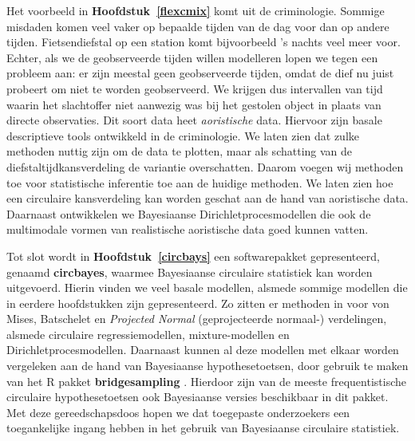 \documentclass[12pt, a4paper]{book}\usepackage[]{graphicx}\usepackage[]{color}
\let\proglang=\textsf
\newcommand{\pkg}[1]{\textbf{#1}}
\begin{document}
Het voorbeeld in \textbf{Hoofdstuk~\ref{flexcmix}} komt uit de criminologie. Sommige misdaden komen veel vaker op bepaalde tijden van de dag voor dan op andere tijden. Fietsendiefstal op een station komt bijvoorbeeld 's nachts veel meer voor. Echter, als we de geobserveerde tijden willen modelleren lopen we tegen een probleem aan: er zijn meestal geen geobserveerde tijden, omdat de dief nu juist probeert om niet te worden geobserveerd. We krijgen dus intervallen van tijd waarin het slachtoffer niet aanwezig was bij het gestolen object in plaats van directe observaties. Dit soort data heet \textit{aoristische} data. Hiervoor zijn basale descriptieve tools ontwikkeld \citep{ashby2013comparison} in de criminologie. We laten zien dat zulke methoden nuttig zijn om de data te plotten, maar als schatting van de diefstaltijdkansverdeling de variantie overschatten. Daarom voegen wij methoden toe voor statistische inferentie toe aan de huidige methoden. We laten zien hoe een circulaire kansverdeling kan worden geschat aan de hand van aoristische data. Daarnaast ontwikkelen we Bayesiaanse Dirichletprocesmodellen die ook de multimodale vormen van realistische aoristische data goed kunnen vatten.

Tot slot wordt in \textbf{Hoofdstuk~\ref{circbays}} een softwarepakket gepresenteerd, genaamd \pkg{circbayes}, waarmee Bayesiaanse circulaire statistiek kan worden uitgevoerd. Hierin vinden we veel basale modellen, alsmede sommige modellen die in eerdere hoofdstukken zijn gepresenteerd. Zo zitten er methoden in voor von Mises, Batschelet en \textit{Projected Normal} (geprojecteerde normaal-) verdelingen, alsmede circulaire regressiemodellen, mixture-modellen en Dirichletprocesmodellen. Daarnaast kunnen al deze modellen met elkaar worden vergeleken aan de hand van Bayesiaanse hypothesetoetsen, door gebruik te maken van het \proglang{R} pakket \pkg{bridgesampling} \citep{gronau2017bridgesampling}. Hierdoor zijn van de meeste frequentistische circulaire hypothesetoetsen ook Bayesiaanse versies beschikbaar in dit pakket. Met deze gereedschapsdoos hopen we dat toegepaste onderzoekers een toegankelijke ingang hebben in het gebruik van Bayesiaanse circulaire statistiek.




\end{document}

